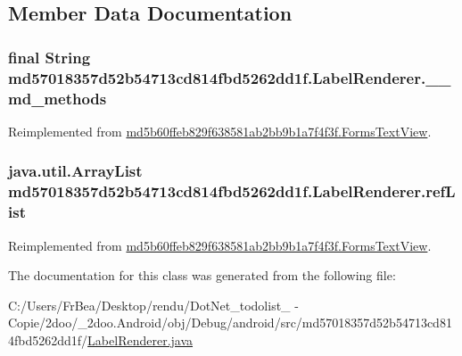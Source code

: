 \subsection{Member Data Documentation}
\hypertarget{classmd57018357d52b54713cd814fbd5262dd1f_1_1_label_renderer_cbf8d2cb7c72ee5391f580882a66080f}{
\subsubsection[{\_\-\_\-md\_\-methods}]{\setlength{\rightskip}{0pt plus 5cm}final String {\bf md57018357d52b54713cd814fbd5262dd1f.LabelRenderer.\_\-\_\-md\_\-methods}}}
\label{classmd57018357d52b54713cd814fbd5262dd1f_1_1_label_renderer_cbf8d2cb7c72ee5391f580882a66080f}




Reimplemented from \hyperlink{classmd5b60ffeb829f638581ab2bb9b1a7f4f3f_1_1_forms_text_view_d4f9b582e68f2509120a1f5414c09541}{md5b60ffeb829f638581ab2bb9b1a7f4f3f.FormsTextView}.\hypertarget{classmd57018357d52b54713cd814fbd5262dd1f_1_1_label_renderer_95ad3ee6fcc2a2fd40aee083882fac72}{
\subsubsection[{refList}]{\setlength{\rightskip}{0pt plus 5cm}java.util.ArrayList {\bf md57018357d52b54713cd814fbd5262dd1f.LabelRenderer.refList}}}
\label{classmd57018357d52b54713cd814fbd5262dd1f_1_1_label_renderer_95ad3ee6fcc2a2fd40aee083882fac72}




Reimplemented from \hyperlink{classmd5b60ffeb829f638581ab2bb9b1a7f4f3f_1_1_forms_text_view_3da090ab0eccaeff99e949ea5d81c1b2}{md5b60ffeb829f638581ab2bb9b1a7f4f3f.FormsTextView}.

The documentation for this class was generated from the following file:\begin{CompactItemize}
\item 
C:/Users/FrBea/Desktop/rendu/DotNet\_\-todolist\_ - Copie/2doo/\_\-2doo.Android/obj/Debug/android/src/md57018357d52b54713cd814fbd5262dd1f/\hyperlink{md57018357d52b54713cd814fbd5262dd1f_2_label_renderer_8java}{LabelRenderer.java}\end{CompactItemize}
